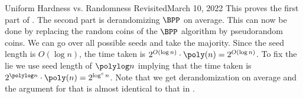 \begin{lecture}{8}{Uniform Hardness vs. Randomness Revisited}{March 10, 2022}
This proves the first part of . The second part is derandomizing $\BPP$ on average. This can now be done by replacing the random coins of the $\BPP$ algorithm by pseudorandom coins. We can go over all possible seeds and take the majority. 
Since the seed length is $O(\log n)$, the time taken is $2^{O(\log n)} \cdot \poly(n) = 2^{O(\log n)}$. 
To fix the lie we use seed length of $\polylog n$ implying that the time taken is $2^{\polylog n} \cdot \poly(n) = 2^{\log^c n}$. 
Note that we get derandomization on average and the argument for that is almost identical to that in .


\end{lecture}
